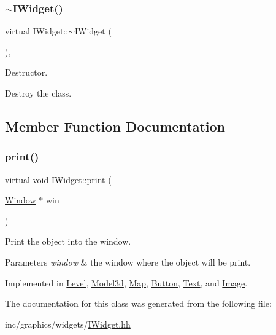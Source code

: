 \subsubsection{\texorpdfstring{$\sim$\+I\+Widget()}{~IWidget()}}
{\footnotesize\ttfamily virtual I\+Widget\+::$\sim$\+I\+Widget (\begin{DoxyParamCaption}{ }\end{DoxyParamCaption})\hspace{0.3cm}{\ttfamily [inline]}, {\ttfamily [virtual]}}



Destructor. 

Destroy the class. 

\subsection{Member Function Documentation}
\mbox{\label{classIWidget_a0cfa49a402e9bb31808a715e048ab2f4}} 
\subsubsection{\texorpdfstring{print()}{print()}}
{\footnotesize\ttfamily virtual void I\+Widget\+::print (\begin{DoxyParamCaption}\item[{\hyperlink{classWindow}{Window} $\ast$}]{win }\end{DoxyParamCaption})\hspace{0.3cm}{\ttfamily [pure virtual]}}



Print the object into the window. 


\begin{DoxyParams}{Parameters}
{\em \textquotesingle{}window\textquotesingle{}} & the window where the object will be print. \\
\hline
\end{DoxyParams}


Implemented in \hyperlink{classLevel_ab8311fe64b7957d627053359331b0b6b}{Level}, \hyperlink{classModel3d_ae02d86ac82ec9f435cf1ebe668f3a6dd}{Model3d}, \hyperlink{classMap_a031a9bf528b1d14c60931d37d68bb4e3}{Map}, \hyperlink{classButton_aaee0c62414711ae91084b05b38d0c8c5}{Button}, \hyperlink{classText_a811c378e24edd0a661cbc0e77ae4e785}{Text}, and \hyperlink{classImage_aca043fb78326d6ce135498419e2d1833}{Image}.



The documentation for this class was generated from the following file\+:\begin{DoxyCompactItemize}
\item 
inc/graphics/widgets/\hyperlink{IWidget_8hh}{I\+Widget.\+hh}\end{DoxyCompactItemize}
